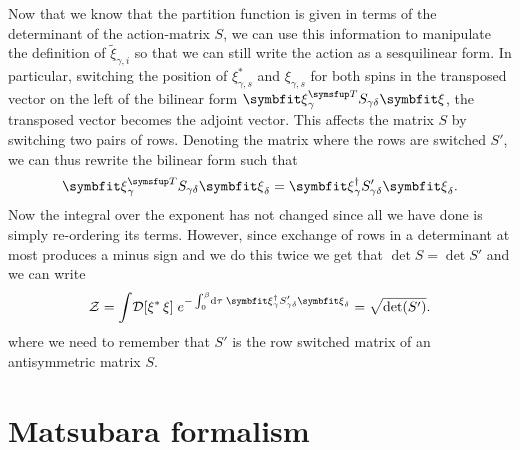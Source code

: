 Now that we know that the partition function is given in terms of the determinant of the action-matrix $S$, we can use this information to manipulate the definition
of $\tilde{\xi}_{\gamma,i}$ so that we can still write the action as a sesquilinear form. In particular, switching the position of $\xi_{\gamma,s}^\ast$ and
$\xi_{\gamma,s}$ for both spins in the transposed vector on the left of the bilinear form $\v{\xi}_\gamma^\trans S_{\gamma\delta} \v{\xi}$, the transposed
vector becomes the adjoint vector. This affects the matrix $S$ by switching two pairs of rows. Denoting the matrix where the rows are switched $S'$, 
we can thus rewrite the bilinear form such that
\begin{equation}
    \label{eq:Field:Ferm:ExNambu:bilinearToSesqui}
    \v{\xi}_\gamma^\trans S_{\gamma\delta}\v{\xi}_\delta = \v{\xi}_\gamma^\dagger S'_{\gamma\delta}\v{\xi}_\delta.
\end{equation}
Now the integral over the exponent has not changed since all we have done is simply re-ordering its terms. However, since exchange of rows in a determinant
at most produces a minus sign and we do this twice we get that $\det S = \det S'$ and we can write
\begin{equation}
    \label{eq:Field:Ferm:ExNambu:partitionFunction:sesquilinear}
    \mathcal{Z} = \int\!\mathcal{D}[\xi^\ast\,\xi]\;e^{-\int_0^\beta\!\mathrm{d}\tau\;\v{\xi}_{\gamma}^\dagger S'_{\gamma\delta}\v{\xi}_{\delta}} = \sqrt{\det(S')}.
\end{equation}
where we need to remember that $S'$ is the row switched matrix of an antisymmetric matrix $S$.


\section{Matsubara formalism}
\label{sec:Field:Mats}

